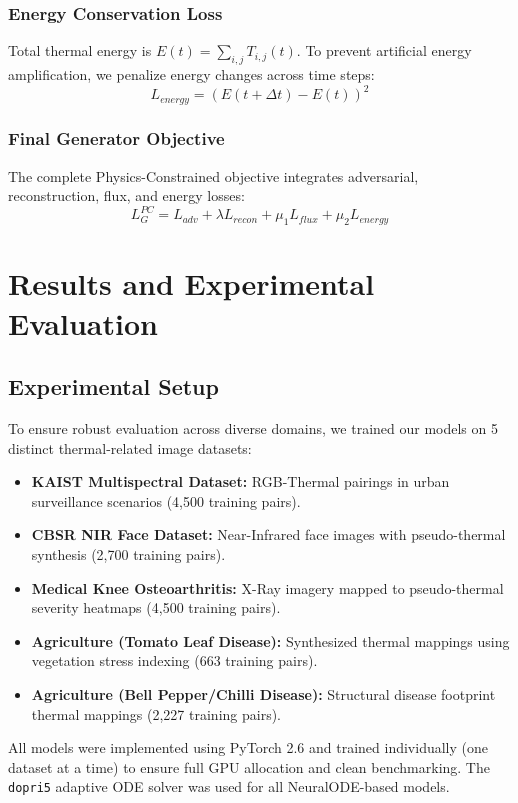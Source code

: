 \documentclass[12pt,a4paper]{report}
\begin{document}
\subsection{Energy Conservation Loss}
Total thermal energy is $E(t) = \sum_{i,j} T_{i,j}(t)$. To prevent artificial energy amplification, we penalize energy changes across time steps:
\begin{equation}
    L_{energy} = (E(t + \Delta t) - E(t))^2
\end{equation}

\subsection{Final Generator Objective}
The complete Physics-Constrained objective integrates adversarial, reconstruction, flux, and energy losses:
\begin{equation}
    L^{PC}_G = L_{adv} + \lambda L_{recon} + \mu_1 L_{flux} + \mu_2 L_{energy}
\end{equation}

\chapter{Results and Experimental Evaluation}
\section{Experimental Setup}
To ensure robust evaluation across diverse domains, we trained our models on 5 distinct thermal-related image datasets:
\begin{itemize}
    \item \textbf{KAIST Multispectral Dataset:} RGB-Thermal pairings in urban surveillance scenarios (4,500 training pairs).
    \item \textbf{CBSR NIR Face Dataset:} Near-Infrared face images with pseudo-thermal synthesis (2,700 training pairs).
    \item \textbf{Medical Knee Osteoarthritis:} X-Ray imagery mapped to pseudo-thermal severity heatmaps (4,500 training pairs).
    \item \textbf{Agriculture (Tomato Leaf Disease):} Synthesized thermal mappings using vegetation stress indexing (663 training pairs).
    \item \textbf{Agriculture (Bell Pepper/Chilli Disease):} Structural disease footprint thermal mappings (2,227 training pairs).
\end{itemize}

\noindent All models were implemented using PyTorch 2.6 and trained individually (one dataset at a time) to ensure full GPU allocation and clean benchmarking. The \texttt{dopri5} adaptive ODE solver was used for all NeuralODE-based models.
\end{document}

